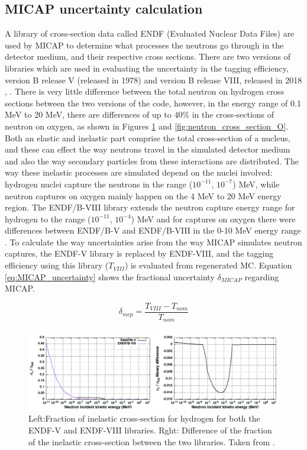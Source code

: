 \subsection{MICAP uncertainty calculation}

A library of cross-section data called ENDF \cite{endf} (Evaluated Nuclear Data Files) are used by MICAP to determine what processes the neutrons go through in the detector medium, and their respective cross sections. There are two versions of libraries which are used in evaluating the uncertainty in the tagging efficiency, version B release V (released in 1978) and version B release VIII, released in 2018 \cite{endf8}, \cite{endf82}. There is very little difference between the total neutron on hydrogen cross sections between the two versions of the code, however, in the energy range of 0.1 MeV to 20 MeV, there are differences of up to 40\% in the cross-sections of neutron on oxygen, as shown in Figures \ref{fig:neutron_cross_section_H} and \ref{fig:neutron_cross_section_O}. Both an elastic and inelastic part comprise the total cross-section of a nucleus, and these can effect the way neutrons travel in the simulated detector medium and also the way secondary particles from these interactions are distributed. The way these inelastic processes are simulated depend on the nuclei involved: hydrogen nuclei capture the neutrons in the range ($10^{-11}$, $10^{-7}$) MeV, while neutron captures on oxygen mainly happen on the 4 MeV to 20 MeV energy region. The ENDF/B-VIII library extends the neutron capture energy range for hydrogen to the range ($10^{-11}$, $10^{-4}$) MeV and for captures on oxygen there were differences between ENDF/B-V and ENDF/B-VIII in the 0-10 MeV energy range \cite{akutsu_thesis}.  To calculate the way uncertainties arise from the way MICAP simulates neutron captures, the ENDF-V library is replaced by ENDF-VIII, and the tagging efficiency using this library ($T_{VIII}$) is evaluated from regenerated MC. Equation \ref{eq:MICAP_uncertainty} shows the fractional uncertainty $\delta_{MICAP}$ regarding MICAP.  

\begin{equation}
    \delta_{m c p}=\frac{T_{V I I I}-T_{n o m}}{T_{n o m}}
\label{eq:MICAP_uncertainty}
\end{equation}

\begin{figure}[!htb]
    \centering
    \includegraphics[width=\textwidth]{Figures/neutron_cross_section_endf_H.PNG}
\caption{Left:Fraction of inelastic cross-section for hydrogen for both the ENDF-V and ENDF-VIII libraries. Rght: Difference of the fraction of the inelastic cross-section between the two libraries. Taken from \cite{tn415_fiacob}.}
\label{fig:neutron_cross_section_H}
\end{figure}

